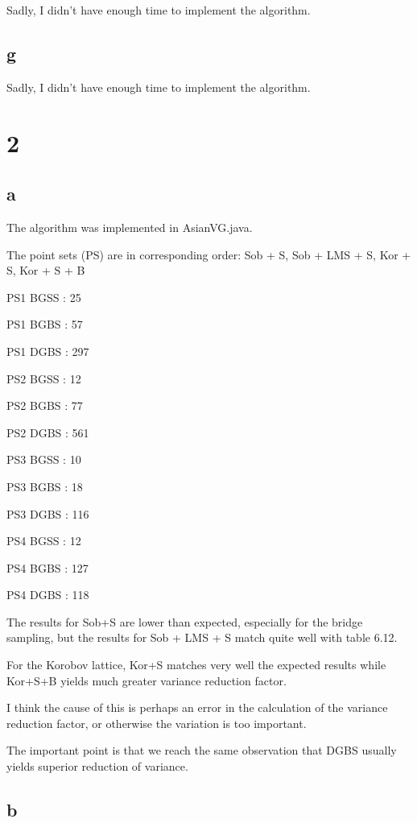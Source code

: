 \documentclass[12pt]{report}
\begin{document}
Sadly, I didn't have enough time to implement the algorithm.

\subsection*{g}
Sadly, I didn't have enough time to implement the algorithm.

\section*{2}



\subsection*{a}

The algorithm was implemented in AsianVG.java.

The point sets (PS) are in corresponding order: Sob + S, Sob + LMS + S, Kor + S, Kor + S + B

PS1 BGSS : 25

PS1 BGBS :  57

PS1 DGBS :  297

PS2 BGSS :  12

PS2 BGBS :  77

PS2 DGBS :  561

PS3 BGSS :  10

PS3 BGBS :  18

PS3 DGBS :  116

PS4 BGSS :  12

PS4 BGBS :  127

PS4 DGBS :  118


The results for Sob+S are lower than expected, especially for the bridge sampling, but the results for Sob + LMS + S match quite well with table 6.12.

For the Korobov lattice, Kor+S matches very well the expected results while Kor+S+B yields much greater variance reduction factor.

I think the cause of this is perhaps an error in the calculation of the variance reduction factor, or otherwise the variation is too important.

The important point is that we reach the same observation that DGBS usually yields superior reduction of variance.




\subsection*{b}
\end{document}
